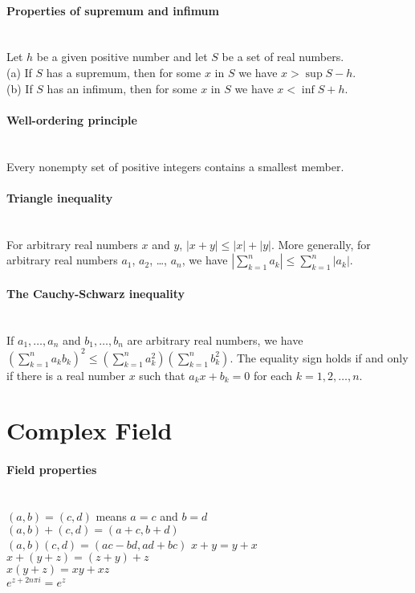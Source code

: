 \documentclass[10pt]{article}
\begin{document}
\paragraph{Properties of supremum and infimum}\ \\
Let $h$ be a given positive number and let $S$ be a set of real numbers.\\ 
(a) If $S$ has a supremum, then for some $x$ in $S$ we have $x > \sup S - h$.\\
(b) If $S$ has an infimum, then for some $x$ in $S$ we have $x < \inf S + h$.

\paragraph{Well-ordering principle}\ \\
Every nonempty set of positive integers contains a smallest member.

\paragraph{Triangle inequality}\ \\
For arbitrary real numbers $x$ and $y$, 
$|x + y| \leq |x| + |y|.$
More generally, for arbitrary real numbers $a_1$, $a_2$, \ldots, $a_n$, we have
$\left|\sum_{k=1}^n a_k\right| \leq \sum_{k=1}^n |a_k|.$

\paragraph{The Cauchy-Schwarz inequality}\ \\
If $a_1, \ldots, a_n$ and $b_1, \ldots, b_n$ are arbitrary real numbers, we have
$\left( \sum_{k=1}^n a_k b_k \right)^2 \leq \left( \sum_{k=1}^n a_k^2 \right) \left( \sum_{k=1}^n b_k^2 \right)$.
The equality sign holds if and only if there is a real number $x$ such that $a_k x + b_k = 0$
for each $k = 1, 2, \ldots, n$.



\bigskip\bigskip
\section{Complex Field}\smallskip

\paragraph{Field properties}\ \\
$(a,b)=(c,d)$ means $a=c$ and $b=d$\\
$(a,b)+(c,d)=(a+c,b+d)$\\
$(a,b)(c,d)=(ac-bd,ad+bc)$
$x+y=y+x$\\
$x+(y+z)=(z+y)+z$\\
$x(y+z)=xy+xz$\\
$e^{z+2n\pi i}=e^z$
\end{document}
